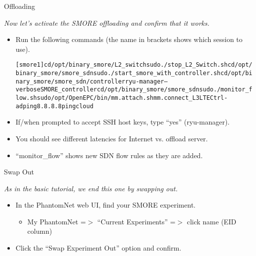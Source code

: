 \documentclass[xcolor=pdftex,dvipsnames,table]{beamer}
\begin{document}
\begin{frame}{Offloading}
  \fontsize{9}{10.2}\selectfont
  \centerline{\emph{Now let's activate the SMORE offloading and confirm that it works.}}
  \begin{itemize}
  \item Run the following commands (the name in brackets shows which session to use).
  \colorbox{SkyBlue!20}{
    \begin{minipage}{\textwidth}
      \begin{alltt}
        [smore{\color{red}1}] cd /opt/binary\_smore/L2\_switch  sudo ./stop\_L2\_Switch.sh  cd /opt/binary\_smore/smore\_sdn  sudo ./start\_smore\_with\_controller.sh  cd /opt/binary\_smore/smore\_sdn/controller  ryu-manager --verbose SMORE\_controller  cd /opt/binary\_smore/smore\_sdn  sudo ./monitor\_flow.sh \newline
        [alice] sudo /opt/OpenEPC/bin/mm.attach.sh  mm.connect\_L3 LTE  Ctrl-a d \newline
        [alice] ping 8.8.8.8 \newline
        [alice] ping cloud
      \end{alltt}
    \end{minipage}
  }
  \item If/when prompted to accept SSH host keys, type ``yes'' (ryu-manager).
  \item You should see different latencies for Internet vs. offload server.
  \item ``monitor\_flow'' shows new SDN flow rules as they are added.
  \end{itemize}
\end{frame}

\begin{frame}{Swap Out}
  \centerline{\emph{As in the basic tutorial, we end this one by swapping out.}}
  \begin{itemize}
    \item In the PhantomNet web UI, find your SMORE experiment.
      \begin{itemize}
        \item My PhantomNet =$>$ ``Current Experiments'' =$>$ click name (EID column)
      \end{itemize}
    \item Click the ``Swap Experiment Out'' option and confirm.
  \end{itemize}
\end{frame}
\end{document}
